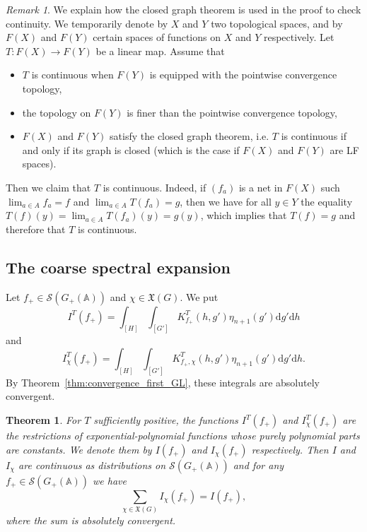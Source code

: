 \documentclass[letterpaper,11pt]{amsart}
\newcommand{\fX}{\mathfrak{X}}
\newcommand{\bA}{\mathbb{A}}
\newcommand{\cS}{\mathcal{S}}
\newcommand{\rd}{\mathrm{d}}
\newcommand{\<}{\negthickspace}
\theoremstyle{definition}
\theoremstyle{plain}
\newtheorem{theorem}[definition]{Theorem}
\theoremstyle{remark}
\newtheorem{remark}[definition]{Remark}
\numberwithin{equation}{section}
\begin{document}
\begin{remark}  \label{remark:closed_graph_theorem}
    We explain how the closed graph theorem is used in the proof to check continuity.
We temporarily denote by $X$ and $Y$ two topological spaces, and by $F(X)$ and $F(Y)$ certain
spaces of functions on $X$ and $Y$ respectively. Let $T : F(X) \to F(Y)$ be a linear map. Assume that
\begin{itemize}
    \item $T$ is continuous when $F(Y)$ is equipped with the pointwise convergence topology,
    \item the topology on $F(Y)$ is finer than the pointwise convergence topology,
    \item $F(X)$ and $F(Y)$ satisfy the closed graph theorem, i.e. $T$ is continuous if and only if its graph is closed (which is the case if $F(X)$ and $F(Y)$ are LF spaces).
\end{itemize}
Then we claim that $T$ is continuous. Indeed, if $(f_a)$ is a net in $F(X)$ such $\lim_{a \in A} f_a =f$ and $\lim_{a \in A} T(f_a)=g$, then we have for all $y \in Y$ the equality $T(f)(y)=\lim_{a \in A} T(f_a)(y)=g(y)$, which implies that $T(f)=g$ and therefore that $T$ is continuous.
\end{remark}








\subsection{The coarse spectral expansion}
Let $f_+ \in \cS(G_+(\bA))$ and $\chi \in \fX(G)$. We put
    \[
    I^T(f_+) = \int_{[H]} \int_{[G']}
    K_{f_+}^T(h, g')
    \eta_{n+1}(g')
    \rd g' \rd h
    \]
and
    \[
    I_{\chi}^T(f_+) = \int_{[H]} \int_{[G']}
    K_{f_+, \chi}^T(h, g')    \eta_{n+1}(g')
    \rd g' \rd h.
    \]
By Theorem~\ref{thm:convergence_first_GL}, these integrals are absolutely
convergent.

\begin{theorem} \label{thm:coarse_spectral_expansion_GL}
For $T$ sufficiently positive, the functions $I^T(f_+)$ and $I_{\chi}^T(f_+)$ are the
restrictions of exponential-polynomial functions whose purely polynomial parts
are constants. We denote them by $I(f_+)$ and $I_{\chi}(f_+)$ respectively.
Then $I$ and $I_\chi$ are continuous as distributions on $\cS(G_+(\bA))$
and for any $f_+ \in \cS(G_+(\bA))$ we have
    \[
    \sum_{\chi \in \fX(G)} I_{\chi}(f_+) = I(f_+),
    \]
where the sum is absolutely convergent.
\end{theorem}
\end{document}
